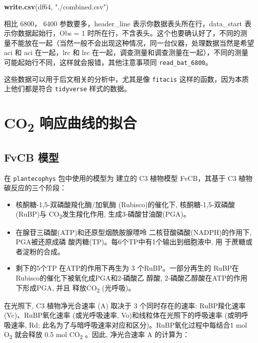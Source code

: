 \documentclass[]{krantz}
\makeatletter
\newenvironment{Shaded}{\begin{snugshade}}{\end{snugshade}}
\newcommand{\KeywordTok}[1]{\textcolor[rgb]{0.13,0.29,0.53}{\textbf{#1}}}
\newcommand{\StringTok}[1]{\textcolor[rgb]{0.31,0.60,0.02}{#1}}
\newcommand{\NormalTok}[1]{#1}
\newenvironment{kframe}{%
\medskip{}
\setlength{\fboxsep}{.8em}
 \def\at@end@of@kframe{}%
 \ifinner\ifhmode%
  \def\at@end@of@kframe{\end{minipage}}%
  \begin{minipage}{\columnwidth}%
 \fi\fi%
 \def\FrameCommand##1{\hskip\@totalleftmargin \hskip-\fboxsep
 \colorbox{shadecolor}{##1}\hskip-\fboxsep
     \hskip-\linewidth \hskip-\@totalleftmargin \hskip\columnwidth}%
 \MakeFramed {\advance\hsize-\width
   \@totalleftmargin\z@ \linewidth\hsize
   \@setminipage}}%
 {\par\unskip\endMakeFramed%
 \at@end@of@kframe}
\renewenvironment{Shaded}{\begin{kframe}}{\end{kframe}}
\theoremstyle{definition}
\theoremstyle{definition}
\theoremstyle{definition}
\theoremstyle{remark}
\makeatother
\begin{document}
\begin{Shaded}
\begin{Highlighting}[]
\KeywordTok{write.csv}\NormalTok{(df64, }\StringTok{"./combined.csv"}\NormalTok{)}
\end{Highlighting}
\end{Shaded}

相比 6800， 6400 参数要多，header\_line
表示你数据表头所在行，data\_start 表示你数据起始行，Obs = 1
时所在行，不含表头。这个也要确认好了，不同的测量不能放在一起（当然一般不会出现这种情况，同一台仪器，处理数据当然是希望
aci 和 aci 在一起，lrc 和 lrc
在一起，调查测量和调查测量在一起），不同的测量可能起始行不同，这样就会报错，其他注意事项同
\texttt{read\_bat\_6800}。

这些数据可以用于后文相关的分析中，尤其是像 \texttt{fitacis}
这样的函数，因为本质上他们都是符合 \texttt{tidyverse} 样式的数据。

\cleardoublepage

\chapter{\texorpdfstring{CO\textsubscript{2}
响应曲线的拟合}{CO2 响应曲线的拟合}}\label{response_fit}

\section{FvCB 模型}\label{fvcb_mod}

在 \texttt{plantecophys} 包中使用的模型为 \citet{Farquhar1980A} 建立的
C3 植物模型 FvCB，其基于 C3 植物碳反应的三个阶段：

\begin{itemize}
\item
  核酮糖-1,5-双磷酸羧化酶/加氧酶 (Rubisco)的催化下,
  核酮糖-1,5-双磷酸(RuBP)与 CO\textsubscript{2}发生羧化作用,
  生成3-磷酸甘油酸(PGA)。
\item
  在腺苷三磷酸(ATP)和还原型烟酰胺腺嘌呤 二核苷酸磷酸(NADPH)的作用下,
  PGA被还原成磷 酸丙糖(TP)。每6个TP中有1个输出到细胞液中, 用
  于蔗糖或者淀粉的合成。
\item
  剩下的5个TP 在ATP的作用下再生为 3 个RuBP。一部分再生的
  RuBP在Rubisco的催化下被氧化成PGA和2-磷酸乙 醇酸,
  2-磷酸乙醇酸在ATP的作用下形成PGA, 并且 释放CO\textsubscript{2}
  (光呼吸)。
\end{itemize}

在光照下, C3 植物净光合速率 (A) 取决于 3 个同时存在的速率:
RuBP羧化速率(Vc)、RuBP氧化速率 (或光呼吸速率,
Vo)和线粒体在光照下的呼吸速率 (或明呼吸速率, Rd;
此名为了与暗呼吸速率对应和区分)。RuBP氧化过程中每结合1 mol
O\textsubscript{2} 就会释放 0.5 mol CO\textsubscript{2} 。因此,
净光合速率 A 的计算为：
\end{document}
